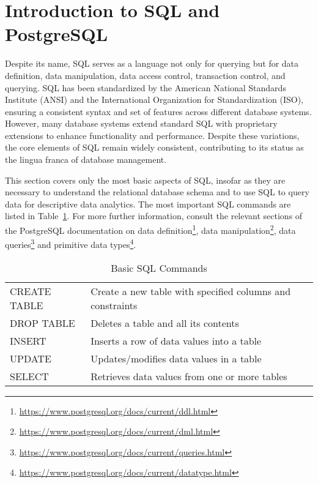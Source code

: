 \section{Introduction to SQL and PostgreSQL}

Despite its name, SQL serves as a language not only for querying but for data definition, data manipulation, data access control, transaction control, and querying. SQL has been standardized by the American National Standards Institute (ANSI) and the International Organization for Standardization (ISO), ensuring a consistent syntax and set of features across different database systems. However, many database systems extend standard SQL with proprietary extensions to enhance functionality and performance. Despite these variations, the core elements of SQL remain widely consistent, contributing to its status as the lingua franca of database management. 

This section covers only the most basic aspects of SQL, insofar as they are necessary to understand the relational database schema and to use SQL to query data for descriptive data analytics. The most important SQL commands are listed in Table~\ref{tab:sql}. For more further information, consult the relevant sections of the PostgreSQL documentation on data definition\footnote{\url{https://www.postgresql.org/docs/current/ddl.html}}, data manipulation\footnote{\url{https://www.postgresql.org/docs/current/dml.html}}, data queries\footnote{\url{https://www.postgresql.org/docs/current/queries.html}} and primitive data types\footnote{\url{https://www.postgresql.org/docs/current/datatype.html}}.

\begin{table}
\renewcommand{\arraystretch}{1.25}
\centering

\begin{tabular}{l|l} \hline
CREATE TABLE & Create a new table with specified columns and constraints \\ 
DROP TABLE & Deletes a table and all its contents \\
INSERT & Inserts a row of data values into a table \\
UPDATE & Updates/modifies data values in a table \\
SELECT & Retrieves data values from one or more tables \\ \hline
\end{tabular}
\caption{Basic SQL Commands}
\label{tab:sql}
\end{table}

